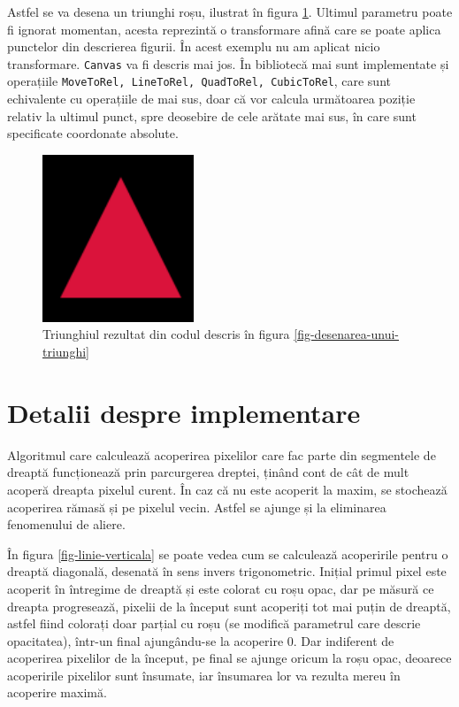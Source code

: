 \documentclass[a4paper, 12pt]{report}
\begin{document}
Astfel se va desena un triunghi roșu, ilustrat în figura \ref{fig-triunghi-simplu}. Ultimul parametru poate fi ignorat momentan, acesta reprezintă o
transformare afină care se poate aplica punctelor din descrierea figurii. În acest exemplu nu am aplicat nicio transformare.
\texttt{Canvas} va fi descris mai jos. În bibliotecă mai sunt implementate și operațiile \texttt{MoveToRel, LineToRel, QuadToRel, CubicToRel},
care sunt echivalente cu operațiile de mai sus, doar că vor calcula următoarea poziție relativ la ultimul punct, spre deosebire de cele arătate
mai sus, în care sunt specificate coordonate absolute.

\begin{figure}[ht]
    \includegraphics[height=5cm]{triunghi_simplu.png}
    \centering
    \caption{Triunghiul rezultat din codul descris în figura \ref{fig-desenarea-unui-triunghi}}
    \label{fig-triunghi-simplu}
\end{figure}

\section{Detalii despre implementare}

Algoritmul care calculează acoperirea pixelilor care fac parte din segmentele de dreaptă funcționează prin parcurgerea dreptei, ținând cont
de cât de mult acoperă dreapta pixelul curent. În caz că nu este acoperit la maxim, se stochează acoperirea rămasă și pe
pixelul vecin. Astfel se ajunge și la eliminarea fenomenului de aliere.

În figura \ref{fig-linie-verticala} se poate vedea cum se calculează acoperirile pentru o dreaptă diagonală, desenată în sens
invers trigonometric. Inițial primul pixel este acoperit în întregime
de dreaptă și este colorat cu roșu opac, dar pe măsură ce dreapta progresează, pixelii de la început sunt acoperiți tot mai puțin
de dreaptă, astfel fiind colorați doar parțial cu roșu (se modifică parametrul care descrie opacitatea), într-un final ajungându-se la
acoperire 0. Dar indiferent de acoperirea pixelilor de la început, pe final se ajunge oricum la roșu opac, deoarece acoperirile pixelilor
sunt însumate, iar însumarea lor va rezulta mereu în acoperire maximă.
\end{document}
